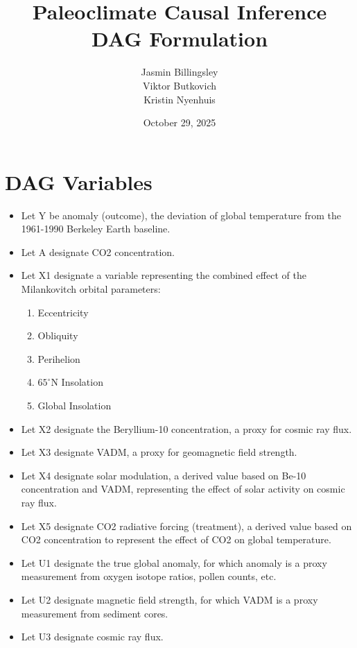 \documentclass{article}
\title{Paleoclimate Causal Inference DAG Formulation}
\author{Jasmin Billingsley \\ Viktor Butkovich \\ Kristin Nyenhuis}
\date{October 29, 2025}
\begin{document}
\maketitle

\section*{DAG Variables}
\begin{itemize}
    \item Let Y be anomaly (outcome), the deviation of global temperature from the 1961-1990 Berkeley Earth baseline.
    \item Let A designate CO2 concentration.
    \item Let X1 designate a variable representing the combined effect of the Milankovitch orbital parameters:
    \begin{enumerate}
        \item Eccentricity
        \item Obliquity
        \item Perihelion
        \item $65^\circ\mathrm{N}$ Insolation
        \item Global Insolation
    \end{enumerate}
    \item Let X2 designate the Beryllium-10 concentration, a proxy for cosmic ray flux.
    \item Let X3 designate VADM, a proxy for geomagnetic field strength.
    \item Let X4 designate solar modulation, a derived value based on Be-10 concentration and VADM, representing the effect of solar activity on cosmic ray flux.
    \item Let X5 designate CO2 radiative forcing (treatment), a derived value based on CO2 concentration to represent the effect of CO2 on global temperature.
    \item Let U1 designate the true global anomaly, for which anomaly is a proxy measurement from oxygen isotope ratios, pollen counts, etc.
    \item Let U2 designate magnetic field strength, for which VADM is a proxy measurement from sediment cores.
    \item Let U3 designate cosmic ray flux.
\end{itemize}
\end{document}

